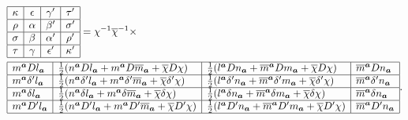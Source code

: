 \begin{equation*}
	\begin{aligned}
		& \begin{array}{|c|c|c|c|}
			\hline
			\kappa  & \epsilon  & \gamma ' & \tau '\\
			\hline
			\rho  & \alpha  & \beta ' & \sigma '\\
			\hline
			\sigma  & \beta  & \alpha ' & \rho '\\
			\hline
			\tau  & \gamma  & \epsilon ' & \kappa '\\
			\hline
		\end{array} =\chi ^{-1}\overline{\chi }^{-1} \times \\
		& \begin{array}{|l|l|l|l|}
			\hline
			m^{\boldsymbol{a}} Dl_{\boldsymbol{a}} & \frac{1}{2} (n^{\boldsymbol{a}} Dl_{\boldsymbol{a}} +m^{\boldsymbol{a}} D\overline{m}_{\boldsymbol{a}} +\overline{\chi } D\chi ) & \frac{1}{2} (l^{\boldsymbol{a}} Dn_{\boldsymbol{a}} +\overline{m}^{\boldsymbol{a}} Dm_{\boldsymbol{a}} +\overline{\chi } D\chi ) & \overline{m}^{\boldsymbol{a}} Dn_{\boldsymbol{a}}\\
			\hline
			m^{\boldsymbol{a}} \delta 'l_{\boldsymbol{a}} & \frac{1}{2} (n^{\boldsymbol{a}} \delta 'l_{\boldsymbol{a}} +m^{\boldsymbol{a}} \delta '\overline{m}_{\boldsymbol{a}} +\overline{\chi } \delta '\chi ) & \frac{1}{2} (l^{\boldsymbol{a}} \delta 'n_{\boldsymbol{a}} +\overline{m}^{\boldsymbol{a}} \delta 'm_{\boldsymbol{a}} +\overline{\chi } \delta '\chi ) & \overline{m}^{\boldsymbol{a}} \delta 'n_{\boldsymbol{a}}\\
			\hline
			m^{\boldsymbol{a}} \delta l_{\boldsymbol{a}} & \frac{1}{2} (n^{\boldsymbol{a}} \delta l_{\boldsymbol{a}} +m^{\boldsymbol{a}} \delta \overline{m}_{\boldsymbol{a}} +\overline{\chi } \delta \chi ) & \frac{1}{2} (l^{\boldsymbol{a}} \delta n_{\boldsymbol{a}} +\overline{m}^{\boldsymbol{a}} \delta m_{\boldsymbol{a}} +\overline{\chi } \delta \chi ) & \overline{m}^{\boldsymbol{a}} \delta n_{\boldsymbol{a}}\\
			\hline
			m^{\boldsymbol{a}} D'l_{\boldsymbol{a}} & \frac{1}{2} (n^{\boldsymbol{a}} D'l_{\boldsymbol{a}} +m^{\boldsymbol{a}} D'\overline{m}_{\boldsymbol{a}} +\overline{\chi } D'\chi ) & \frac{1}{2} (l^{\boldsymbol{a}} D'n_{\boldsymbol{a}} +\overline{m}^{\boldsymbol{a}} D'm_{\boldsymbol{a}} +\overline{\chi } D'\chi ) & \overline{m}^{\boldsymbol{a}} D'n_{\boldsymbol{a}}\\
			\hline
		\end{array} .
	\end{aligned}
\end{equation*}
